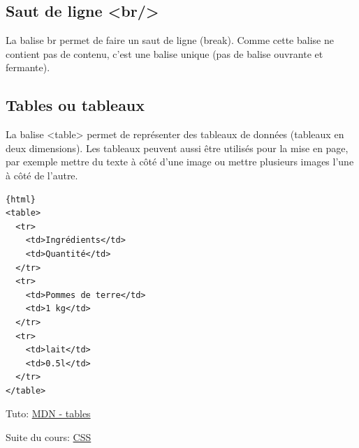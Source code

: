 \documentclass[a4paper,11pt]{article}
\begin{document}
\subsection{Saut de ligne <br/>}
La balise br permet de faire un saut de ligne (break). Comme cette balise ne contient pas de contenu, c'est une balise unique (pas de balise ouvrante et fermante).

\subsection{Tables ou tableaux}
La balise <table> permet de représenter des tableaux de données (tableaux en deux dimensions). Les tableaux peuvent aussi être utilisés pour la mise en page, par exemple mettre du texte à côté d'une image ou mettre plusieurs images l'une à côté de l'autre.
\begin{verbatim}{html}
<table>
  <tr>
    <td>Ingrédients</td>
    <td>Quantité</td>
  </tr>
  <tr>
    <td>Pommes de terre</td>
    <td>1 kg</td>
  </tr>
  <tr>
    <td>lait</td>
    <td>0.5l</td>
  </tr>
</table>
\end{verbatim}
Tuto: \href{https://developer.mozilla.org/fr/docs/Web/HTML/Element/table}{MDN - tables}\par

Suite du cours: \href{http://127.0.0.1:8000/doc/Informatique/CSS}{CSS}
\end{document}
